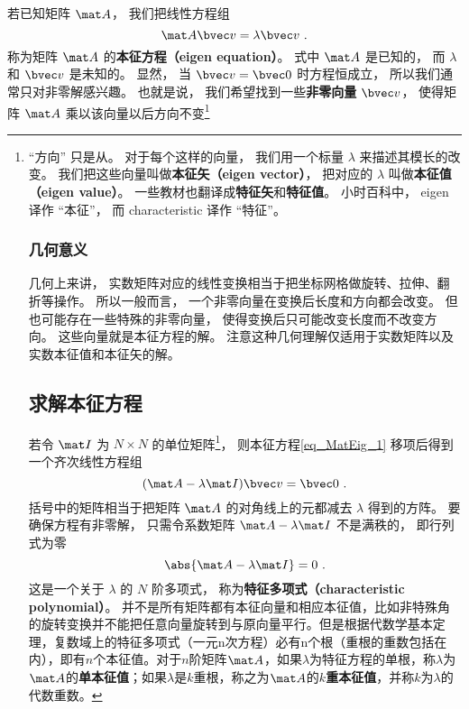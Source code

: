 

若已知矩阵 $\mat A$， 我们把线性方程组
\begin{equation}\label{eq_MatEig_1}
\mat A \bvec v = \lambda \bvec v~.
\end{equation}
称为矩阵 $\mat A$ 的\textbf{本征方程（eigen equation）}。 式中 $\mat A$ 是已知的， 而 $\lambda$ 和 $\bvec v$ 是未知的。 显然， 当 $\bvec v = \bvec 0$ 时方程恒成立， 所以我们通常只对非零解感兴趣。 也就是说， 我们希望找到一些\textbf{非零向量} $\bvec v$， 使得矩阵 $\mat A$ 乘以该向量以后方向不变\footnote{“方向” 只是从。 对于每个这样的向量， 我们用一个标量 $\lambda$ 来描述其模长的改变。 我们把这些向量叫做\textbf{本征矢（eigen vector）}， 把对应的 $\lambda$ 叫做\textbf{本征值（eigen value）}。 一些教材也翻译成\textbf{特征矢}和\textbf{特征值}。 小时百科中， eigen 译作 “本征”， 而 characteristic 译作 “特征”。

\subsubsection{几何意义}
几何上来讲， 实数矩阵对应的线性变换相当于把坐标网格做旋转、拉伸、翻折等操作。%
所以一般而言， 一个非零向量在变换后长度和方向都会改变。 但也可能存在一些特殊的非零向量， 使得变换后只可能改变长度而不改变方向。 这些向量就是本征方程的解。 注意这种几何理解仅适用于实数矩阵以及实数本征值和本征矢的解。

\subsection{求解本征方程}\label{sub_MatEig_1}

若令 $\mat I$ 为 $N\times N$ 的单位矩阵\footnote{即对角线上的元为 1， 其他元为 0， 见“矩阵”}， 则本征方程\autoref{eq_MatEig_1} 移项后得到一个齐次线性方程组
\begin{equation}\label{eq_MatEig_2}
(\mat A - \lambda\mat I)\bvec v = \bvec 0~.
\end{equation}
括号中的矩阵相当于把矩阵 $\mat A$ 的对角线上的元都减去 $\lambda$ 得到的方阵。 要确保方程有非零解， 只需令系数矩阵 $\mat A - \lambda\mat I$ 不是满秩的， 即行列式为零
\begin{equation}\label{eq_MatEig_4}
\abs{\mat A - \lambda\mat I} = 0~.
\end{equation}
这是一个关于 $\lambda$ 的 $N$ 阶多项式， 称为\textbf{特征多项式（characteristic polynomial）}。 并不是所有矩阵都有本征向量和相应本征值，比如非特殊角的旋转变换并不能把任意向量旋转到与原向量平行。但是根据代数学基本定理，复数域上的特征多项式（一元n次方程）必有n个根（重根的重数包括在内），即有$n$个本征值。对于$n$阶矩阵$\mat A$，如果$\lambda$为特征方程的单根，称$\lambda$为$\mat A$的\textbf{单本征值}；如果$\lambda$是$k$重根，称之为$\mat A$的\textbf{$k$重本征值}，并称$k$为$\lambda$的代数重数。

}
